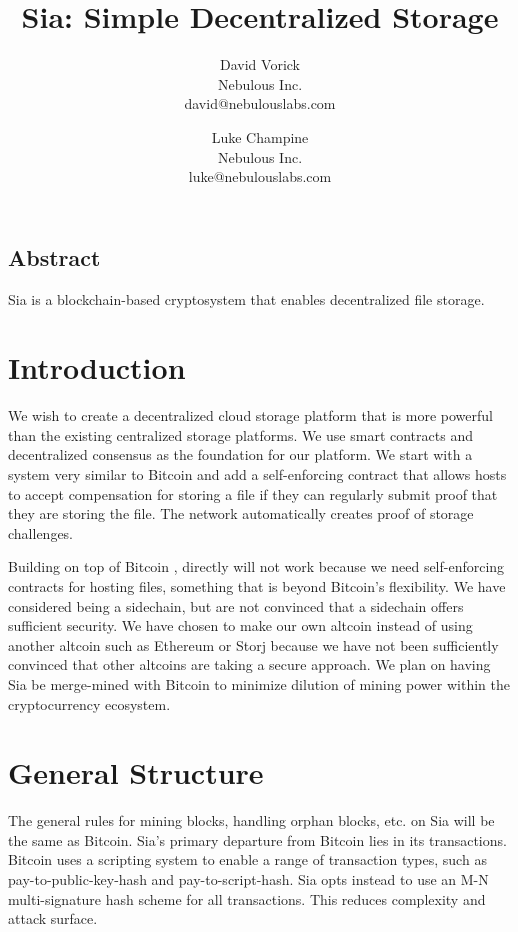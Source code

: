 \documentclass[twocolumn]{article}
\begin{document}
\frenchspacing

\title{Sia: Simple Decentralized Storage}

\author{
{\rm David Vorick}\\
Nebulous Inc.\\
david@nebulouslabs.com
\and
{\rm Luke Champine}\\
Nebulous Inc.\\
luke@nebulouslabs.com
}

\maketitle

\subsection*{Abstract}
Sia is a blockchain-based cryptosystem that enables decentralized file storage.

\section{Introduction}
We wish to create a decentralized cloud storage platform that is more powerful than the existing centralized storage platforms.
We use smart contracts and decentralized consensus as the foundation for our platform.
We start with a system very similar to Bitcoin and add a self-enforcing contract that allows hosts to accept compensation for storing a file if they can regularly submit proof that they are storing the file.
The network automatically creates proof of storage challenges.

Building on top of Bitcoin \cite{btc}, \cite{btcdg} directly will not work because we need self-enforcing contracts for hosting files, something that is beyond Bitcoin's flexibility.
We have considered being a sidechain, but are not convinced that a sidechain offers sufficient security.
We have chosen to make our own altcoin instead of using another altcoin such as Ethereum or Storj because we have not been sufficiently convinced that other altcoins are taking a secure approach.
We plan on having Sia be merge-mined with Bitcoin to minimize dilution of mining power within the cryptocurrency ecosystem.

\section{General Structure}
The general rules for mining blocks, handling orphan blocks, etc. on Sia will be the same as Bitcoin.
Sia's primary departure from Bitcoin lies in its transactions.
Bitcoin uses a scripting system to enable a range of transaction types, such as pay-to-public-key-hash and pay-to-script-hash.
Sia opts instead to use an M-N multi-signature hash scheme for all transactions.
This reduces complexity and attack surface.
\end{document}
